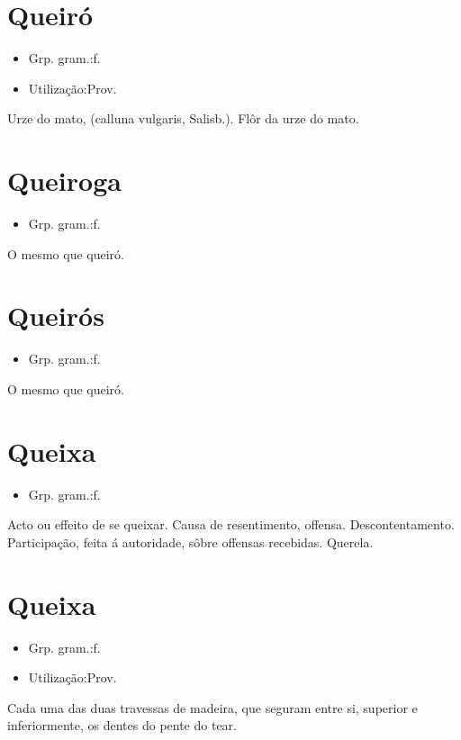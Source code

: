 \section{Queiró}
\begin{itemize}
\item {Grp. gram.:f.}
\end{itemize}
\begin{itemize}
\item {Utilização:Prov.}
\end{itemize}
Urze do mato, (\textunderscore calluna vulgaris\textunderscore , Salisb.).
Flôr da urze do mato.
\section{Queiroga}
\begin{itemize}
\item {Grp. gram.:f.}
\end{itemize}
O mesmo que \textunderscore queiró\textunderscore .
\section{Queirós}
\begin{itemize}
\item {Grp. gram.:f.}
\end{itemize}
O mesmo que \textunderscore queiró\textunderscore .
\section{Queixa}
\begin{itemize}
\item {Grp. gram.:f.}
\end{itemize}
Acto ou effeito de se queixar.
Causa de resentimento, offensa.
Descontentamento.
Participação, feita á autoridade, sôbre offensas recebidas.
Querela.
\section{Queixa}
\begin{itemize}
\item {Grp. gram.:f.}
\end{itemize}
\begin{itemize}
\item {Utilização:Prov.}
\end{itemize}
Cada uma das duas travessas de madeira, que seguram entre si, superior e inferiormente, os dentes do pente do tear.
